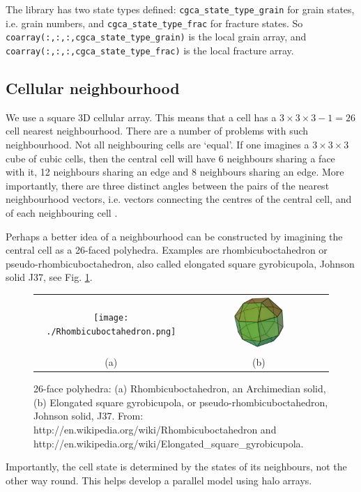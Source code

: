 The library has two state types defined:
\texttt{cgca\_state\_type\_grain} for grain states,
i.e. grain numbers, and
\texttt{cgca\_state\_type\_frac} for fracture states.
So \texttt{coarray(:,:,:,cgca\_state\_type\_grain)} is
the local grain array, and
\texttt{coarray(:,:,:,cgca\_state\_type\_frac)} is
the local fracture array.

\subsection{Cellular neighbourhood}

We use a square 3D cellular array.
This means that a cell has a
$3 \times 3 \times 3 - 1 = 26$
cell nearest neighbourhood.
There are a number of problems with such
neighbourhood.
Not all neighbouring cells are `equal'.
If one imagines a $3\times 3 \times 3$ cube
of cubic cells, then the central cell will
have 6 neighbours sharing a face with it,
12 neighbours sharing an edge and 8 neighbours
sharing an edge.
More importantly, there are
three distinct angles between the pairs of the
nearest neighbourhood vectors, i.e. vectors
connecting the centres of the central cell,
and of each neighbouring cell \cite{shterenlikht2013c}.

Perhaps a better idea of a neighbourhood can
be constructed by imagining the central cell
as a 26-faced polyhedra.
Examples are rhombicuboctahedron or
pseudo-rhombicuboctahedron, also called
elongated square gyrobicupola, Johnson solid
J37, see Fig. \ref{fig:j37}.

\begin{figure}
\begin{tabular}{cc}
\texttt{[image: ./Rhombicuboctahedron.png]}
&
\includegraphics[width=0.4\textwidth]{./Elongated_square_gyrobicupola.png}
\\
(a) & (b)
\end{tabular}
\caption{
26-face polyhedra: (a) Rhombicuboctahedron, an Archimedian
solid, (b) Elongated square gyrobicupola, or
pseudo-rhombicuboctahedron, Johnson solid, J37.
From: http://en.wikipedia.org/wiki/Rhombicuboctahedron and
http://en.wikipedia.org/wiki/Elongated\_square\_gyrobicupola.
}
\label{fig:j37}
\end{figure}

Importantly, the cell state is determined
by the states of its neighbours, not the
other way round.
This helps develop a parallel model using
halo arrays.

